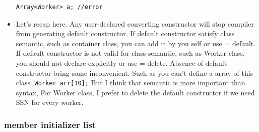 \documentclass[a4paper,11pt,twoside]{book}
\begin{document}
\begin{itemize}
\begin{lstlisting}
Array<Worker> a; //error
\end{lstlisting}


	\item Let's recap here. Any user-declared converting constructor will stop compiler from generating default constructor. If default constructor satisfy class semantic, such as container class, you can add it by you self or use = default. If default constructor is not valid for class semantic, such as Worker class, you should not declare explicitly or use = delete. Absence of default constructor bring some inconvenient. Such as you can't define a array of this class. \texttt{Worker arr[10];} But I think that semantic is more important than syntax, For Worker class, I prefer to delete the default constructor if we need SSN for every worker. 
	
\end{itemize}

\subsubsection{member initializer list}
\end{document}
